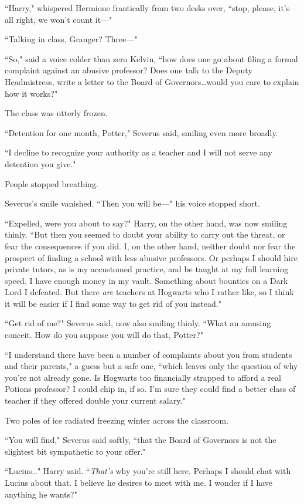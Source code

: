 ``Harry," whispered Hermione frantically from two desks over, ``stop, please, it's all right, we won't count it—"

``Talking in class, Granger? Three—"

``So," said a voice colder than zero Kelvin, ``how does one go about filing a formal complaint against an abusive professor? Does one talk to the Deputy Headmistress, write a letter to the Board of Governors…would you care to explain how it works?"

The class was utterly frozen.

``Detention for one month, Potter," Severus said, smiling even more broadly.

``I decline to recognize your authority as a teacher and I will not serve any detention you give."

People stopped breathing.

Severus's smile vanished. ``Then you will be—" his voice stopped short.

``Expelled, were you about to say?" Harry, on the other hand, was now smiling thinly. ``But then you seemed to doubt your ability to carry out the threat, or fear the consequences if you did. I, on the other hand, neither doubt nor fear the prospect of finding a school with less abusive professors. Or perhaps I should hire private tutors, as is my accustomed practice, and be taught at my full learning speed. I have enough money in my vault. Something about bounties on a Dark Lord I defeated. But there \emph{are} teachers at Hogwarts who I rather like, so I think it will be easier if I find some way to get rid of you instead."

``Get rid of me?" Severus said, now also smiling thinly. ``What an amusing conceit. How do you suppose you will do that, Potter?"

``I understand there have been a number of complaints about you from students and their parents," a guess but a safe one, ``which leaves only the question of why you're not already gone. Is Hogwarts too financially strapped to afford a real Potions professor? I could chip in, if so. I'm sure they could find a better class of teacher if they offered double your current salary."

Two poles of ice radiated freezing winter across the classroom.

``You will find," Severus said softly, ``that the Board of Governors is not the slightest bit sympathetic to your offer."

``Lucius…" Harry said. ``\emph{That's} why you're still here. Perhaps I should chat with Lucius about that. I believe he desires to meet with me. I wonder if I have anything he wants?"

